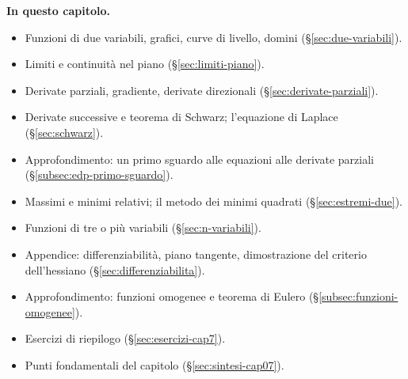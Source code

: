 \medskip
\noindent\textbf{In questo capitolo.}
\begin{itemize}
  \item Funzioni di due variabili, grafici, curve di livello, domini
  (\S\ref{sec:due-variabili}).
  \item Limiti e continuità nel piano (\S\ref{sec:limiti-piano}).
  \item Derivate parziali, gradiente, derivate direzionali (\S\ref{sec:derivate-parziali}).
  \item Derivate successive e teorema di Schwarz; l'equazione di Laplace
  (\S\ref{sec:schwarz}).
  \item Approfondimento: un primo sguardo alle equazioni alle derivate parziali
  (\S\ref{subsec:edp-primo-sguardo}).
  \item Massimi e minimi relativi; il metodo dei minimi quadrati (\S\ref{sec:estremi-due}).
  \item Funzioni di tre o più variabili (\S\ref{sec:n-variabili}).
  \item Appendice: differenziabilità, piano tangente, dimostrazione del criterio
  dell'hessiano (\S\ref{sec:differenziabilita}).
  \item Approfondimento: funzioni omogenee e teorema di Eulero
  (\S\ref{subsec:funzioni-omogenee}).
  \item Esercizi di riepilogo (\S\ref{sec:esercizi-cap7}).
  \item Punti fondamentali del capitolo (\S\ref{sec:sintesi-cap07}).
\end{itemize}










